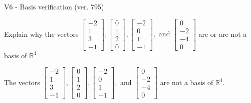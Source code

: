 \begin{exercise}
  \begin{exerciseTitle}V6 - Basis verification (ver. 795)\end{exerciseTitle}
  \begin{exerciseStatement}
    Explain why the vectors \(\left[\begin{array}{r}
-2 \\
1 \\
3 \\
-1
\end{array}\right] , \left[\begin{array}{r}
0 \\
1 \\
2 \\
0
\end{array}\right] , \left[\begin{array}{r}
-2 \\
0 \\
1 \\
-1
\end{array}\right] , \text{ and } \left[\begin{array}{r}
0 \\
-2 \\
-4 \\
0
\end{array}\right]\) are or are not a basis of \(\mathbb{R}^4\)	


  \end{exerciseStatement}
  \begin{exerciseAnswer}
   The vectors \(\left[\begin{array}{r}
-2 \\
1 \\
3 \\
-1
\end{array}\right] , \left[\begin{array}{r}
0 \\
1 \\
2 \\
0
\end{array}\right] , \left[\begin{array}{r}
-2 \\
0 \\
1 \\
-1
\end{array}\right] , \text{ and } \left[\begin{array}{r}
0 \\
-2 \\
-4 \\
0
\end{array}\right]\) 
  	 are not  a basis of \(\mathbb{R}^4\).
  


  \end{exerciseAnswer}
\end{exercise}